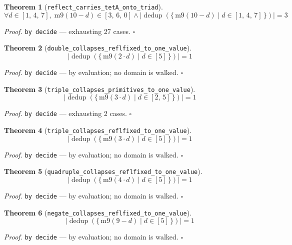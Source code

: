 \documentclass[11pt]{article}
\newtheorem{theorem}{Theorem}[section]
\begin{document}
\begin{theorem}[\texttt{reflect\_carries\_tetA\_onto\_triad}]
\[ \forall d \in [1,\,4,\,7],\; \mathrm{m9}\mathopen{}\left(10 - d\right) \in [3,\,6,\,0] \land \left|\operatorname{dedup}\left(\{\, \mathrm{m9}\mathopen{}\left(10 - d\right) \mid d \in [1,\,4,\,7] \,\}\right)\right| = 3 \]
\end{theorem}
\noindent\emph{Proof.} \texttt{by decide} --- exhausting 27 cases. \hfill$\square$

\begin{theorem}[\texttt{double\_collapses\_reflfixed\_to\_one\_value}]
\[ \left|\operatorname{dedup}\left(\{\, \mathrm{m9}\mathopen{}\left(2 \cdot d\right) \mid d \in [5] \,\}\right)\right| = 1 \]
\end{theorem}
\noindent\emph{Proof.} \texttt{by decide} --- by evaluation; no domain is walked. \hfill$\square$

\begin{theorem}[\texttt{triple\_collapses\_primitives\_to\_one\_value}]
\[ \left|\operatorname{dedup}\left(\{\, \mathrm{m9}\mathopen{}\left(3 \cdot d\right) \mid d \in [2,\,5] \,\}\right)\right| = 1 \]
\end{theorem}
\noindent\emph{Proof.} \texttt{by decide} --- exhausting 2 cases. \hfill$\square$

\begin{theorem}[\texttt{triple\_collapses\_reflfixed\_to\_one\_value}]
\[ \left|\operatorname{dedup}\left(\{\, \mathrm{m9}\mathopen{}\left(3 \cdot d\right) \mid d \in [5] \,\}\right)\right| = 1 \]
\end{theorem}
\noindent\emph{Proof.} \texttt{by decide} --- by evaluation; no domain is walked. \hfill$\square$

\begin{theorem}[\texttt{quadruple\_collapses\_reflfixed\_to\_one\_value}]
\[ \left|\operatorname{dedup}\left(\{\, \mathrm{m9}\mathopen{}\left(4 \cdot d\right) \mid d \in [5] \,\}\right)\right| = 1 \]
\end{theorem}
\noindent\emph{Proof.} \texttt{by decide} --- by evaluation; no domain is walked. \hfill$\square$

\begin{theorem}[\texttt{negate\_collapses\_reflfixed\_to\_one\_value}]
\[ \left|\operatorname{dedup}\left(\{\, \mathrm{m9}\mathopen{}\left(9 - d\right) \mid d \in [5] \,\}\right)\right| = 1 \]
\end{theorem}
\noindent\emph{Proof.} \texttt{by decide} --- by evaluation; no domain is walked. \hfill$\square$
\end{document}
